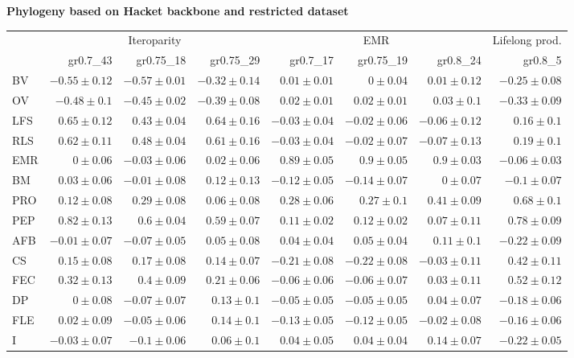 \begin{landscape}
\begin{table}
\begin{footnotesize}
\textbf{Phylogeny based on Hacket backbone and restricted dataset}

\begin{tabular}{@{}l|rrr|rrr|r@{}}
\toprule
 & \multicolumn{3}{c|}{Iteroparity} & \multicolumn{3}{c|}{EMR} & \multicolumn{1}{c}{Lifelong prod.}\\
 & gr0.7\_43 & gr0.75\_18 & gr0.75\_29 & gr0.7\_17 & gr0.75\_19 & gr0.8\_24 & gr0.8\_5\\
\midrule
BV & $-0.55 \pm 0.12$ & $-0.57 \pm 0.01$ & $-0.32 \pm 0.14$ & $0.01 \pm 0.01$ & $0 \pm 0.04$ & $0.01 \pm 0.12$ & $-0.25 \pm 0.08$\\
OV & $-0.48 \pm 0.1$ & $-0.45 \pm 0.02$ & $-0.39 \pm 0.08$ & $0.02 \pm 0.01$ & $0.02 \pm 0.01$ & $0.03 \pm 0.1$ & $-0.33 \pm 0.09$\\
LFS & $0.65 \pm 0.12$ & $0.43 \pm 0.04$ & $0.64 \pm 0.16$ & $-0.03 \pm 0.04$ & $-0.02 \pm 0.06$ & $-0.06 \pm 0.12$ & $0.16 \pm 0.1$\\
RLS & $0.62 \pm 0.11$ & $0.48 \pm 0.04$ & $0.61 \pm 0.16$ & $-0.03 \pm 0.04$ & $-0.02 \pm 0.07$ & $-0.07 \pm 0.13$ & $0.19 \pm 0.1$\\
EMR & $0 \pm 0.06$ & $-0.03 \pm 0.06$ & $0.02 \pm 0.06$ & $0.89 \pm 0.05$ & $0.9 \pm 0.05$ & $0.9 \pm 0.03$ & $-0.06 \pm 0.03$\\
BM & $0.03 \pm 0.06$ & $-0.01 \pm 0.08$ & $0.12 \pm 0.13$ & $-0.12 \pm 0.05$ & $-0.14 \pm 0.07$ & $0 \pm 0.07$ & $-0.1 \pm 0.07$\\
PRO & $0.12 \pm 0.08$ & $0.29 \pm 0.08$ & $0.06 \pm 0.08$ & $0.28 \pm 0.06$ & $0.27 \pm 0.1$ & $0.41 \pm 0.09$ & $0.68 \pm 0.1$\\
PEP & $0.82 \pm 0.13$ & $0.6 \pm 0.04$ & $0.59 \pm 0.07$ & $0.11 \pm 0.02$ & $0.12 \pm 0.02$ & $0.07 \pm 0.11$ & $0.78 \pm 0.09$\\
AFB & $-0.01 \pm 0.07$ & $-0.07 \pm 0.05$ & $0.05 \pm 0.08$ & $0.04 \pm 0.04$ & $0.05 \pm 0.04$ & $0.11 \pm 0.1$ & $-0.22 \pm 0.09$\\
CS & $0.15 \pm 0.08$ & $0.17 \pm 0.08$ & $0.14 \pm 0.07$ & $-0.21 \pm 0.08$ & $-0.22 \pm 0.08$ & $-0.03 \pm 0.11$ & $0.42 \pm 0.11$\\
FEC & $0.32 \pm 0.13$ & $0.4 \pm 0.09$ & $0.21 \pm 0.06$ & $-0.06 \pm 0.06$ & $-0.06 \pm 0.07$ & $0.03 \pm 0.11$ & $0.52 \pm 0.12$\\
DP & $0 \pm 0.08$ & $-0.07 \pm 0.07$ & $0.13 \pm 0.1$ & $-0.05 \pm 0.05$ & $-0.05 \pm 0.05$ & $0.04 \pm 0.07$ & $-0.18 \pm 0.06$\\
FLE & $0.02 \pm 0.09$ & $-0.05 \pm 0.06$ & $0.14 \pm 0.1$ & $-0.13 \pm 0.05$ & $-0.12 \pm 0.05$ & $-0.02 \pm 0.08$ & $-0.16 \pm 0.06$\\
I & $-0.03 \pm 0.07$ & $-0.1 \pm 0.06$ & $0.06 \pm 0.1$ & $0.04 \pm 0.05$ & $0.04 \pm 0.04$ & $0.14 \pm 0.07$ & $-0.22 \pm 0.05$\\
\bottomrule
\end{tabular}

\end{footnotesize}
\end{table}
\end{landscape}%


